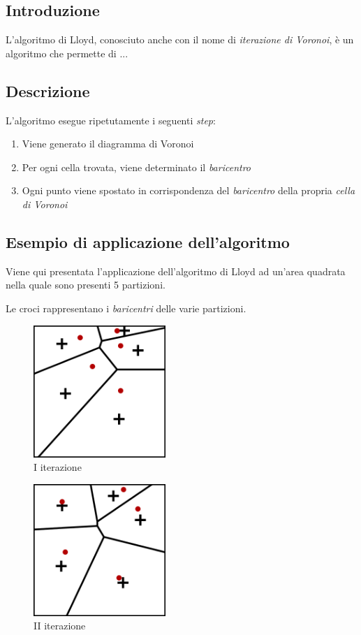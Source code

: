 \documentclass[10pt,a4paper]{article}
\begin{document}
\subsection{Introduzione}

L'algoritmo di Lloyd, conosciuto anche con il nome di \textit{iterazione di Voronoi}, è un algoritmo che permette di ...

\subsection{Descrizione}

L'algoritmo esegue ripetutamente i seguenti \textit{step}:

\begin{enumerate}
	\item Viene generato il diagramma di Voronoi
	\item Per ogni cella trovata, viene determinato il \textit{baricentro}
	\item Ogni punto viene spostato in corrispondenza del \textit{baricentro} della propria \textit{cella di Voronoi}
\end{enumerate}

\subsection{Esempio di applicazione dell'algoritmo}

Viene qui presentata l'applicazione dell'algoritmo di Lloyd ad un'area quadrata nella quale sono presenti 5 partizioni.

Le croci rappresentano i \textit{baricentri} delle varie partizioni.

\begin{figure}[H]
\includegraphics[width=5cm]{lloyd_iterazione_1.png}
\centering
\caption{I iterazione}
\end{figure}

\begin{figure}[H]
\includegraphics[width=5cm]{lloyd_iterazione_2.png}
\centering
\caption{II iterazione}
\end{figure}
\end{document}
